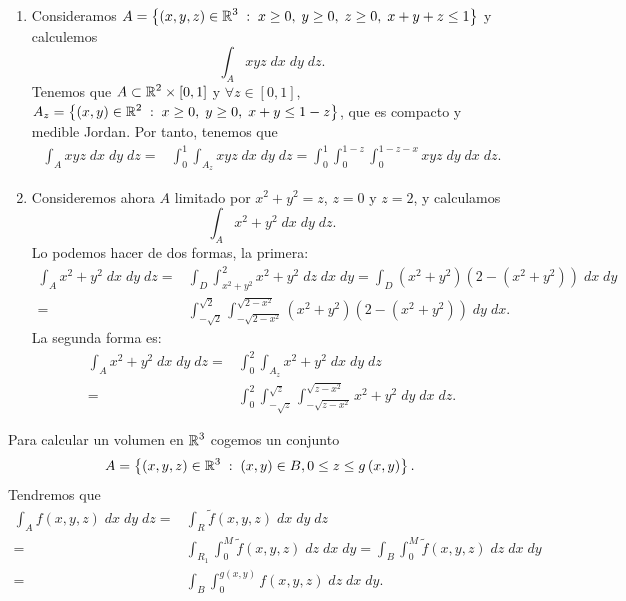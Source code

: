 \begin{eg}
	\begin{enumerate}
	\item Consideramos $\displaystyle A = \left\{ \left(x,y,z\right)\in \mathbb{R}^{3} \; : \; x \geq 0, \; y \geq 0, \; z \geq 0, \; x+y+z\leq 1\right\}  $ y calculemos 
	\[\int _{A}xyz \; dx \; dy \; dz .\]
	Tenemos que $\displaystyle A \subset \mathbb{R}^{2} \times \left[0,1\right]  $ y $\displaystyle \forall z \in \left[0,1\right]  $, $\displaystyle A_{z}= \left\{ \left(x,y\right)\in \mathbb{R}^{2} \; : \; x \geq 0, \; y \geq 0, \; x + y \leq 1 - z\right\}  $, que es compacto y medible Jordan. Por tanto, tenemos que 
	\[
	\begin{split}
		\int _{A}xyz \; dx \; dy \; dz=& \int^{1}_{0} \int _{A_{z}}xyz \; dx \; dy \; dz = \int^{1}_{0} \int^{1-z}_{0} \int^{1-z-x}_{0} xyz \; dy \; dx \; dz .
	\end{split}
	\]
\item Consideremos ahora $\displaystyle A $ limitado por $\displaystyle x^{2}+y^{2}=z $, $\displaystyle z = 0 $ y $\displaystyle z = 2 $, y calculamos
	\[\int _{A}x^{2}+y^{2} \; dx \; dy \; dz .\]
	Lo podemos hacer de dos formas, la primera:
	\[
	\begin{split}
		\int _{A}x^{2}+y^{2} \; dx \; dy \; dz = & \int _{D}\int^{2}_{x^{2}+y^{2}} x^{2}+y^{2} \; dz \; dx \; dy = \int _{D}\left(x^{2}+y^{2}\right)\left(2-\left(x^{2}+y^{2}\right)\right) \; dx \; dy \\
		= & \int^{\sqrt{2}}_{-\sqrt{2}} \int^{\sqrt{2-x^{2}}}_{-\sqrt{2-x^{2}}}  \left(x^{2}+y^{2}\right)\left(2-\left(x^{2}+y^{2}\right)\right) \; dy \; dx .
	\end{split}
	\]
	La segunda forma es:
	\[
	\begin{split}
		\int _{A}x^{2}+y^{2} \; dx \; dy \; dz = & \int^{2}_{0} \int _{A_{z}}x^{2}+y^{2} \; dx \; dy \; dz \\
		= &  \int^{2}_{0} \int^{\sqrt{z}}_{-\sqrt{z}} \int^{\sqrt{z-x^{2}}}_{-\sqrt{z-x^{2}}} x^{2}+y^{2} \; dy \; dx \; dz   .
	\end{split}
	\]
	
	\end{enumerate}
\end{eg}
\begin{eg}
	Para calcular un volumen en $\displaystyle \mathbb{R}^{3} $ cogemos un conjunto 
	\[ A = \left\{ \left(x,y,z\right)\in \mathbb{R}^{3} \; :\; \left(x,y\right) \in B, 0 \leq z \leq g\left(x,y\right)\right\}.\]
	Tendremos que 
\[
\begin{split}
	\int _{A}f\left(x,y,z\right) \; dx \; dy \; dz = & \int _{R}\tilde{f}\left(x,y,z\right) \; dx \; dy \; dz \\
	= & \int _{R_{1}}\int^{M}_{0} \tilde{f}\left(x,y,z\right)\; dz \; dx\; dy =\int _{B}\int^{M}_{0} \tilde{f}\left(x,y,z\right)\; dz \; dx \; dy\\
	= & \int _{B}\int^{g\left(x,y\right)}_{0} f\left(x,y,z\right)\; dz \; dx \; dy.
\end{split}
\]
\end{eg}
